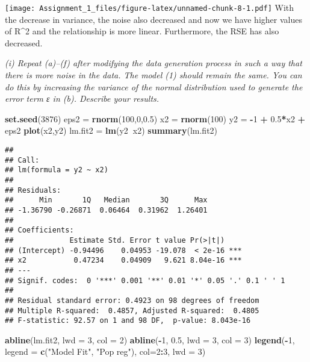 \documentclass[]{article}
\newenvironment{Shaded}{\begin{snugshade}}{\end{snugshade}}
\newcommand{\KeywordTok}[1]{\textcolor[rgb]{0.13,0.29,0.53}{\textbf{#1}}}
\newcommand{\DataTypeTok}[1]{\textcolor[rgb]{0.13,0.29,0.53}{#1}}
\newcommand{\DecValTok}[1]{\textcolor[rgb]{0.00,0.00,0.81}{#1}}
\newcommand{\FloatTok}[1]{\textcolor[rgb]{0.00,0.00,0.81}{#1}}
\newcommand{\StringTok}[1]{\textcolor[rgb]{0.31,0.60,0.02}{#1}}
\newcommand{\OperatorTok}[1]{\textcolor[rgb]{0.81,0.36,0.00}{\textbf{#1}}}
\newcommand{\NormalTok}[1]{#1}
\begin{document}
\texttt{[image: Assignment\_1\_files/figure-latex/unnamed-chunk-8-1.pdf]}
With the decrease in variance, the noise also decreased and now we have
higher values of R\^{}2 and the relationship is more linear.
Furthermore, the RSE has also decreased.

\emph{(i) Repeat (a)--(f) after modifying the data generation process in
such a way that there is more noise in the data. The model (1) should
remain the same. You can do this by increasing the variance of the
normal distribution used to generate the error term ε in (b). Describe
your results.}

\begin{Shaded}
\begin{Highlighting}[]
\KeywordTok{set.seed}\NormalTok{(}\DecValTok{3876}\NormalTok{)}
\NormalTok{eps2 =}\StringTok{ }\KeywordTok{rnorm}\NormalTok{(}\DecValTok{100}\NormalTok{,}\DecValTok{0}\NormalTok{,}\FloatTok{0.5}\NormalTok{)}
\NormalTok{x2 =}\StringTok{ }\KeywordTok{rnorm}\NormalTok{(}\DecValTok{100}\NormalTok{)}
\NormalTok{y2 =}\StringTok{ }\OperatorTok{-}\DecValTok{1} \OperatorTok{+}\StringTok{ }\FloatTok{0.5}\OperatorTok{*}\NormalTok{x2 }\OperatorTok{+}\StringTok{ }\NormalTok{eps2}
\KeywordTok{plot}\NormalTok{(x2,y2)}
\NormalTok{lm.fit2 =}\StringTok{ }\KeywordTok{lm}\NormalTok{(y2}\OperatorTok{~}\NormalTok{x2)}
\KeywordTok{summary}\NormalTok{(lm.fit2)}
\end{Highlighting}
\end{Shaded}

\begin{verbatim}
## 
## Call:
## lm(formula = y2 ~ x2)
## 
## Residuals:
##      Min       1Q   Median       3Q      Max 
## -1.36790 -0.26871  0.06464  0.31962  1.26401 
## 
## Coefficients:
##             Estimate Std. Error t value Pr(>|t|)    
## (Intercept) -0.94496    0.04953 -19.078  < 2e-16 ***
## x2           0.47234    0.04909   9.621 8.04e-16 ***
## ---
## Signif. codes:  0 '***' 0.001 '**' 0.01 '*' 0.05 '.' 0.1 ' ' 1
## 
## Residual standard error: 0.4923 on 98 degrees of freedom
## Multiple R-squared:  0.4857, Adjusted R-squared:  0.4805 
## F-statistic: 92.57 on 1 and 98 DF,  p-value: 8.043e-16
\end{verbatim}

\begin{Shaded}
\begin{Highlighting}[]
\KeywordTok{abline}\NormalTok{(lm.fit2, }\DataTypeTok{lwd =} \DecValTok{3}\NormalTok{, }\DataTypeTok{col =} \DecValTok{2}\NormalTok{)}
\KeywordTok{abline}\NormalTok{(}\OperatorTok{-}\DecValTok{1}\NormalTok{, }\FloatTok{0.5}\NormalTok{, }\DataTypeTok{lwd =} \DecValTok{3}\NormalTok{, }\DataTypeTok{col =} \DecValTok{3}\NormalTok{)}
\KeywordTok{legend}\NormalTok{(}\OperatorTok{-}\DecValTok{1}\NormalTok{, }\DataTypeTok{legend =} \KeywordTok{c}\NormalTok{(}\StringTok{"Model Fit"}\NormalTok{, }\StringTok{"Pop reg"}\NormalTok{), }\DataTypeTok{col=}\DecValTok{2}\OperatorTok{:}\DecValTok{3}\NormalTok{, }\DataTypeTok{lwd =} \DecValTok{3}\NormalTok{)}
\end{Highlighting}
\end{Shaded}
\end{document}
